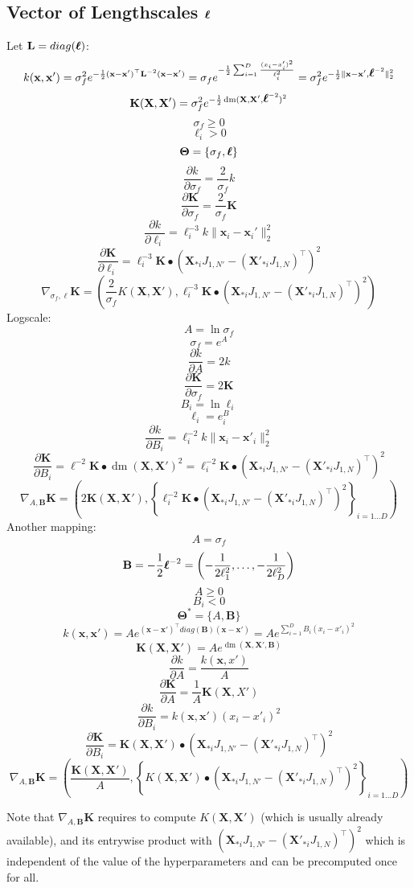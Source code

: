 \documentclass[a4paper,11pt]{article}
\newcommand\x{{\mathbf x}}
\newcommand\X{{\mathbf X}}
\newcommand\K{{\mathbf K}}
\newcommand\LL{{\mathbf L}}
\newcommand\ELL{{\Ivec \ell}}
\DeclareMathOperator*{\dm}{dm}
\newcommand{\Ivec}[1]{\mbox{\boldmath $#1$}}
\begin{document}
\subsection{Vector of Lengthscales $\ELL$}
Let $\mathbf{L} = diag(\ELL)$:
$$k(\x,\x') = \sigma_f^2 e^{-\frac{1}{2}(\x-\x')^{\top} \LL^{-2}
  (\x-\x')} = \sigma_f e^{-\frac{1}{2}\sum_{i=1}^D \frac{(x_i -
    x'_i)^2}{\ell_i^2}} = \sigma_f^2
e^{-\frac{1}{2}\|\x-\x',\ELL^{-2}\|_2^2}$$
$$\K(\X,\X') = \sigma_f^2 e^{-\frac{1}{2} \dm(\X,\X',\ELL^{-2})^2}$$
$$\sigma_f \ge 0$$
$$\ell_i > 0$$
$$\mathbf{\Theta} = \{ \sigma_f, \ELL\}$$
$$\frac{\partial k}{\partial \sigma_f} = \frac{2}{\sigma_f}k$$
$$\frac{\partial \K}{\partial \sigma_f} = \frac{2}{\sigma_f}\K$$
$$\frac{\partial k}{\partial \ell_i} = \ell_i^{-3} k \|\x_i-\x_i'\|_2^2 $$
$$\frac{\partial \K}{\partial \ell_i} = \ell_i^{-3} \K \bullet (\X_{*i}J_{1,N'}- (\X'_{*i}J_{1,N})^{\top})^2$$
$$\nabla_{\sigma_f,\ell} \K = \left(\frac{2}{\sigma_f}K(\X,\X'), \ell_i^{-3} \K \bullet (\X_{*i}J_{1,N'}- (\X'_{*i}J_{1,N})^{\top})^2 \right)$$
Logscale:
$$A = \ln{\sigma_f}$$
$$\sigma_f = e^A$$
$$\frac{\partial k}{\partial A} = 2k$$
$$\frac{\partial \K}{\partial \sigma_f} = 2\K$$
$$B_i = \ln{\ell_i}$$
$$\ell_i = e^B_i$$
$$\frac{\partial k}{\partial B_i} = \ell_i^{-2} k \|\x_i-\x'_i\|_2^2$$
$$\frac{\partial \K}{\partial B_i} = \ell^{-2} \K \bullet \dm(\X,\X')^2 = \ell_i^{-2} \K \bullet (\X_{*i}J_{1,N'}- (\X'_{*i}J_{1,N})^{\top})^2$$
$$\nabla_{A,\mathbf{B}} \K = \left( 2\K(\X,\X'), \left\{ \ell_i^{-2} \K \bullet (\X_{*i}J_{1,N'}- (\X'_{*i}J_{1,N})^{\top})^2 \right\}_{i=1 \ldots D} \right)$$
Another mapping:
$$A = \sigma_f$$
$$\mathbf{B} = -\frac{1}{2}\ELL^{-2} =
\left(-\frac{1}{2\ell_1^2},\ldots,-\frac{1}{2\ell_D^2} \right)$$
$$A \ge 0$$
$$B_i < 0$$
$$\mathbf{\Theta}^* = \{ A, \mathbf{B}\}$$
$$k(\x,\x') = A e^{(\x-\x')^{\top} diag(\mathbf{B}) (\x-\x')} = A
e^{\sum_{i=1}^D B_i (x_i - x'_i)^2}$$ 
$$\K(\X,\X') = A e^{\dm(\X,\X',\mathbf{B})}$$
$$\frac{\partial k}{\partial A} = \frac{k(\x,x')}{A}$$
$$\frac{\partial \K}{\partial A} = \frac{1}{A}\K(\X,X')$$
$$\frac{\partial k}{\partial B_i} = k(\x,\x') (x_i -x'_i)^2$$
$$\frac{\partial \K}{\partial B_i} = \K(\X,\X') \bullet
(\X_{*i}J_{1,N'}- (\X'_{*i}J_{1,N})^{\top})^2$$
$$\nabla_{A,\mathbf{B}} \K = \left(\frac{\K(\X,\X')}{A}, \left\{ K(\X,\X')
  \bullet (\X_{*i}J_{1,N'}- (\X'_{*i}J_{1,N})^{\top})^2 \right\}_{i=1
  \ldots D} \right)$$

Note that $\nabla_{A,\mathbf{B}} \K$ requires to compute $K(\X,\X')$
(which is usually already available), and its entrywise product with
$(\X_{*i}J_{1,N'}- (\X'_{*i}J_{1,N})^{\top})^2$ which is independent
of the value of the hyperparameters and can be precomputed once for
all.
\end{document}
